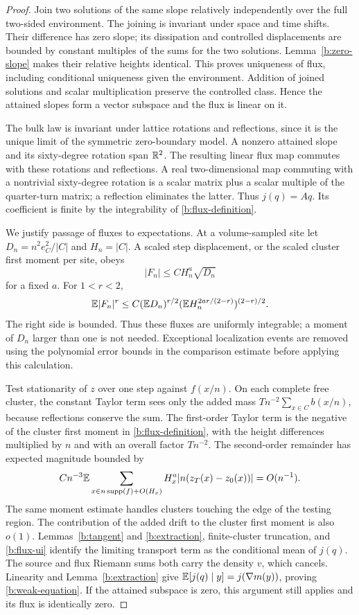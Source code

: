 \begin{proof}
Join two solutions of the same slope relatively independently over the
full two-sided environment. The joining is invariant under space and time
shifts. Their difference has zero slope; its dissipation and controlled
displacements are bounded by constant multiples of the sums for the two
solutions. Lemma~\ref{b:zero-slope} makes their relative heights identical.
This proves uniqueness of flux, including conditional uniqueness given
the environment. Addition of joined solutions and scalar multiplication
preserve the controlled class. Hence the attained slopes form a vector
subspace and the flux is linear on it.

The bulk law is invariant under lattice rotations and reflections, since
it is the unique limit of the symmetric zero-boundary model. A nonzero
attained slope and its sixty-degree rotation span $\mathbb R^2$. The resulting
linear flux map commutes with these rotations and reflections. A real
two-dimensional map commuting with a nontrivial sixty-degree rotation
is a scalar matrix plus a scalar multiple of the quarter-turn matrix;
a reflection eliminates the latter. Thus $j(q)=Aq$. Its coefficient is
finite by the integrability of \eqref{b:flux-definition}.

We justify passage of fluxes to expectations. At a volume-sampled site let
$D_n=n^2e_C^2/|C|$ and $H_n=|C|$. A scaled step displacement, or the
scaled cluster first moment per site, obeys
\[
 |F_n|\le C H_n^a\sqrt{D_n}
\]
for a fixed $a$. For $1<r<2$,
\begin{equation}\label{b:flux-ui}
 \mathbb E|F_n|^r\le
 C(\mathbb E D_n)^{r/2}
  (\mathbb E H_n^{2ar/(2-r)})^{(2-r)/2}.
\end{equation}
The right side is bounded. Thus these fluxes are uniformly integrable;
a moment of $D_n$ larger than one is not needed. Exceptional localization
events are removed using the polynomial error bounds in the comparison
estimate before applying this calculation.

Test stationarity of $z$ over one step against $f(x/n)$. On each complete
free cluster, the constant Taylor term sees only the added mass
$Tn^{-2}\sum_{x\in C}b(x/n)$, because reflections conserve the sum.
The first-order Taylor term is the negative of the cluster first moment
in \eqref{b:flux-definition}, with the height differences multiplied by
$n$ and with an overall factor $Tn^{-2}$. The second-order remainder has
expected magnitude bounded by
\[
 C n^{-3}\mathbb E\sum_{x\in n\operatorname{supp}(f)+O(H_x)}
                 H_x^a|n(z_T(x)-z_0(x))|=O(n^{-1}).
\]
The same moment estimate handles clusters touching the edge of the
testing region. The contribution of the added drift to the cluster
first moment is also $o(1)$. Lemmas~\ref{b:tangent} and
\ref{b:extraction}, finite-cluster truncation, and
\eqref{b:flux-ui} identify the limiting transport term as the conditional
mean of $j(q)$. The source and flux Riemann sums both carry the density
$v$, which cancels. Linearity and Lemma~\ref{b:extraction} give
$\mathbb E[j(q)\mid y]=j(\nabla m(y))$, proving
\eqref{b:weak-equation}. If the attained subspace is zero, this argument
still applies and its flux is identically zero.
\end{proof}

